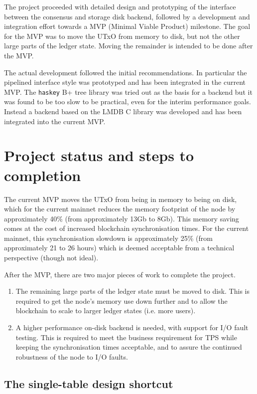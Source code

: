 \documentclass[11pt,a4paper]{article}
\begin{document}
The project proceeded with detailed design \citep{utxo-db-api} and prototyping
of the interface between the consensus and storage disk backend, followed by
a development and integration effort towards a MVP (Minimal Viable Product)
milestone. The goal for the MVP was to move the UTxO from memory to disk, but
not the other large parts of the ledger state. Moving the remainder is intended
to be done after the MVP.

The actual development followed the initial recommendations. In particular the
pipelined interface style was prototyped and has been integrated in the current
MVP. The \texttt{haskey} B+ tree library was tried out as the basis for a
backend but it was found to be too slow to be practical, even for the interim
performance goals. Instead a backend based on the LMDB C library was developed
and has been integrated into the current MVP.

\section{Project status and steps to completion}

The current MVP moves the UTxO from being in memory to being on disk, which
for the current mainnet reduces the memory footprint of the node by
approximately 40\% (from approximately  13Gb to 8Gb). This memory saving comes
at the cost of increased blockchain synchronisation times. For the current
mainnet, this synchronisation slowdown is approximately 25\% (from
approximately 21 to 26 hours) which is deemed acceptable from a technical
perspective (though not ideal).

After the MVP, there are two major pieces of work to complete the project.
\begin{enumerate}
\item The remaining large parts of the ledger state must be moved to disk. This
      is required to get the node's memory use down further and to allow the
      blockchain to scale to larger ledger states (i.e. more users).
\item A higher performance on-disk backend is needed, with support for I/O fault
      testing. This is required to meet the business requirement for TPS while
      keeping the synchronisation times acceptable, and to assure the continued
      robustness of the node to I/O faults.
\end{enumerate}

\subsection{The single-table design shortcut}
\label{sec:single-table-design-shortcut}
\end{document}

